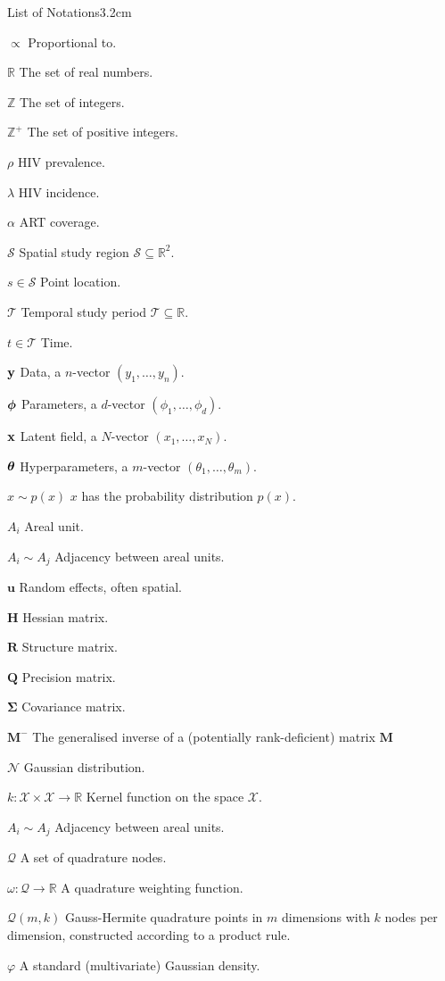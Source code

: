 \begin{mclistof}{List of Notations}{3.2cm}

\item[$\propto$] Proportional to.
\item[$\mathbb{R}$] The set of real numbers.
\item[$\mathbb{Z}$] The set of integers.
\item[$\mathbb{Z}^+$] The set of positive integers.
\item[$\rho$] HIV prevalence.
\item[$\lambda$] HIV incidence.
\item[$\alpha$] ART coverage.
\item[$\mathcal{S}$] Spatial study region $\mathcal{S} \subseteq \mathbb{R}^2$.
\item[$s \in \mathcal{S}$] Point location.
\item[$\mathcal{T}$] Temporal study period $\mathcal{T} \subseteq \mathbb{R}$.
\item[$t \in \mathcal{T}$] Time.
\item[$\boldsymbol{\mathbf{y}}$] Data, a $n$-vector $(y_1, \ldots, y_n)$.
\item[$\boldsymbol{\mathbf{\phi}}$] Parameters, a $d$-vector $(\phi_1, \ldots, \phi_d)$.
\item[$\mathbf{x}$] Latent field, a $N$-vector $(x_1, \ldots, x_N)$.
\item[$\bm{\theta}$] Hyperparameters, a $m$-vector $(\theta_1, \ldots, \theta_m)$.
\item[$x \sim p(x)$] $x$ has the probability distribution $p(x)$.
\item[$A_i$] Areal unit.
\item[$A_i \sim A_j$] Adjacency between areal units.
\item[$\mathbf{u}$] Random effects, often spatial.
\item[$\mathbf{H}$] Hessian matrix.
\item[$\mathbf{R}$] Structure matrix.
\item[$\mathbf{Q}$] Precision matrix.
\item[$\bm{\Sigma}$] Covariance matrix.
\item[$\mathbf{M}^{-}$] The generalised inverse of a (potentially rank-deficient) matrix $\mathbf{M}$
\item[$\mathcal{N}$] Gaussian distribution.
\item[$k: \mathcal{X} \times \mathcal{X} \to \mathbb{R}$] Kernel function on the space $\mathcal{X}$.
\item[$A_i \sim A_j$] Adjacency between areal units.
\item[$\mathcal{Q}$] A set of quadrature nodes.
\item[$\omega: \mathcal{Q} \to \mathbb{R}$] A quadrature weighting function.
\item[$\mathcal{Q}(m, k)$] Gauss-Hermite quadrature points in $m$ dimensions with $k$ nodes per dimension, constructed according to a product rule.
\item[$\varphi$] A standard (multivariate) Gaussian density.

\end{mclistof} 